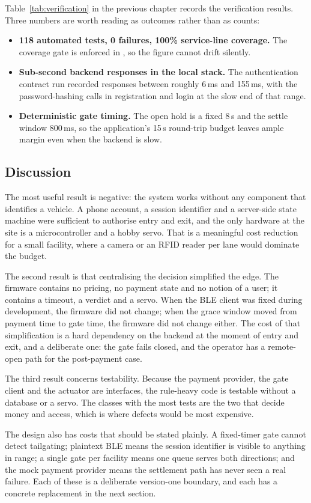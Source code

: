 Table~\ref{tab:verification} in the previous chapter records the verification
results. Three numbers are worth reading as outcomes rather than as counts:

\begin{itemize}
  \item \textbf{118 automated tests, 0 failures, 100\% service-line coverage.} The
        coverage gate is enforced in , so the figure cannot drift
        silently.
  \item \textbf{Sub-second backend responses in the local stack.} The authentication
        contract run recorded responses between roughly 6\,ms and 155\,ms, with the
        password-hashing calls in registration and login at the slow end of that
        range.
  \item \textbf{Deterministic gate timing.} The open hold is a fixed 8\,s and the
        settle window 800\,ms, so the application's 15\,s round-trip budget leaves
        ample margin even when the backend is slow.
\end{itemize}

\subsection*{Discussion}

The most useful result is negative: the system works without any component that
identifies a vehicle. A phone account, a session identifier and a server-side state
machine were sufficient to authorise entry and exit, and the only hardware at the
site is a microcontroller and a hobby servo. That is a meaningful cost reduction for
a small facility, where a camera or an RFID reader per lane would dominate the
budget.

The second result is that centralising the decision simplified the edge. The firmware
contains no pricing, no payment state and no notion of a user; it contains a timeout,
a verdict and a servo. When the BLE client was fixed during development, the firmware
did not change; when the grace window moved from payment time to gate time, the
firmware did not change either. The cost of that simplification is a hard dependency
on the backend at the moment of entry and exit, and a deliberate one: the gate fails
closed, and the operator has a remote-open path for the post-payment case.

The third result concerns testability. Because the payment provider, the gate client
and the actuator are interfaces, the rule-heavy code is testable without a database
or a servo. The classes with the most tests are the two that decide money and access,
which is where defects would be most expensive.

The design also has costs that should be stated plainly. A fixed-timer gate cannot
detect tailgating; plaintext BLE means the session identifier is visible to anything
in range; a single gate per facility means one queue serves both directions; and the
mock payment provider means the settlement path has never seen a real failure. Each
of these is a deliberate version-one boundary, and each has a concrete replacement in
the next section.

